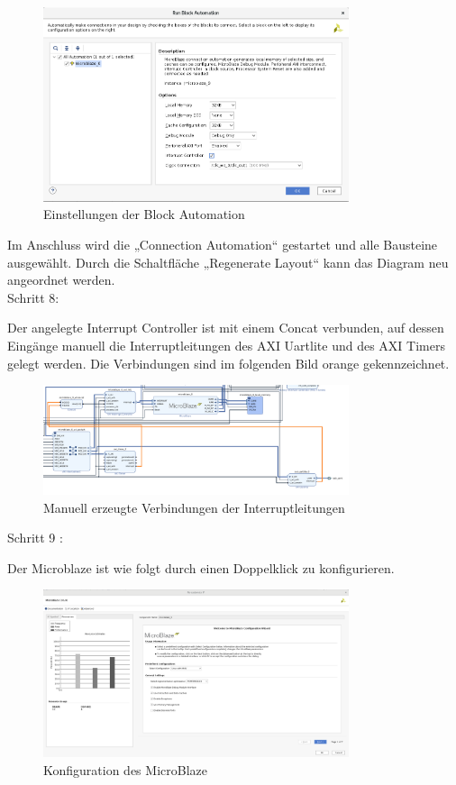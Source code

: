 \begin{figure}[H]
\centering
\includegraphics[width=0.8\textwidth]{Hauptteil/schritt7.png}
\caption{Einstellungen der Block Automation}
\label{fig:mbschritt7}
\end{figure}


Im Anschluss wird die „Connection Automation“ gestartet und alle Bausteine ausgewählt.
Durch die Schaltfläche „Regenerate Layout“ kann das Diagram neu angeordnet werden.\\

Schritt 8:

Der angelegte Interrupt Controller ist mit einem Concat verbunden, auf dessen Eingänge manuell die Interruptleitungen des AXI Uartlite und des AXI Timers gelegt werden.
Die Verbindungen sind im folgenden Bild orange gekennzeichnet.

\begin{figure}[H]
\centering
\includegraphics[width=0.8\textwidth]{Hauptteil/Schritt8.png}
\caption{Manuell erzeugte Verbindungen der Interruptleitungen}
\label{fig:mbschritt8}
\end{figure}

Schritt 9 :

Der Microblaze ist wie folgt durch einen Doppelklick zu konfigurieren.

\begin{figure}[H]
\centering
\includegraphics[width=0.8\textwidth]{Hauptteil/Schritt9.png}
\caption{Konfiguration des MicroBlaze}
\label{fig:mbschritt9}
\end{figure}

